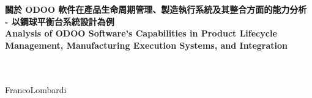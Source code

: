 \documentclass[12pt,a4paper]{report}  %
\begin{document}
\sectionef %
\vspace{12em}
\begin{titlepage}%
\begin{center}   %
\\[18pt]
\\[18pt]
\sectionef\fontsize{24pt}{1em}\selectfont\textbf
{
\vspace{0.5em}
關於 ODOO 軟件在產品生命周期管理、製造執行系統及其整合方面的能力分析}\\[18pt]
\vspace{1em} %
\fontsize{24pt}{1pt}\selectfont\textbf{- 以鋼球平衡台系統設計為例}\\
\vspace{1em}
\sectionef\fontsize{24pt}{1em}\selectfont\textbf
{
\vspace{0.5em}
Analysis of ODOO Software's Capabilities in Product Lifecycle Management, Manufacturing Execution Systems, and Integration}
 \vspace{1em}
\end{center}
\begin{flushleft}
\begin{LARGE}

\hspace{32mm}\\[6pt]
\hspace{32mm}\\[6pt]
{\hspace{43mm}\quad Franco\quad Lombardi}\\[6pt]
\end{LARGE}
\end{flushleft}
\vspace{4em}
\fontsize{18pt}{2pt}\selectfont\centerline{}
\end{titlepage}
\newpage
\end{document}
